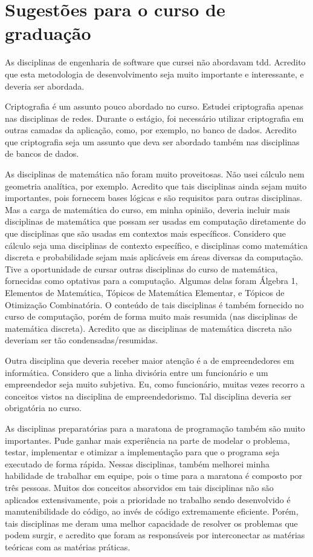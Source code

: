 \section{Sugestões para o curso de graduação}

As disciplinas de engenharia de software que cursei não abordavam \gls{tdd}. Acredito que esta metodologia de desenvolvimento seja
muito importante e interessante, e deveria ser abordada.

Criptografia é um assunto pouco abordado no curso. Estudei criptografia apenas nas disciplinas de redes. Durante o estágio, foi necessário
utilizar criptografia em outras camadas da aplicação, como, por exemplo, no banco de dados. Acredito que criptografia seja um assunto
que deva ser abordado também nas disciplinas de bancos de dados.

As disciplinas de matemática não foram muito proveitosas. Não usei cálculo nem geometria analítica, por exemplo. 
Acredito que tais disciplinas ainda sejam muito importantes, pois fornecem bases lógicas e são requisitos para outras disciplinas. 
Mas a carga de matemática do curso, em minha opinião, deveria incluir mais disciplinas de matemática que possam ser usadas em computação 
diretamente do que disciplinas que são usadas em contextos mais específicos. Considero que cálculo seja uma disciplinas de contexto 
específico, e disciplinas como matemática discreta e probabilidade sejam mais aplicáveis em áreas diversas da computação. Tive a 
oportunidade de cursar outras disciplinas do curso de matemática, fornecidas como optativas para a computação. Algumas delas 
foram Álgebra 1, Elementos de Matemática, Tópicos de Matemática Elementar, e Tópicos de Otimização Combinatória. O conteúdo de 
tais disciplinas é também fornecido no curso de computação, porém de forma muito mais resumida (nas disciplinas de matemática discreta). 
Acredito que as disciplinas de matemática discreta não deveriam ser tão condensadas/resumidas.

Outra disciplina que deveria receber maior atenção é a de empreendedores em informática. Considero que a linha divisória entre um 
funcionário e um empreendedor seja muito subjetiva. Eu, como funcionário, muitas vezes recorro a conceitos vistos na disciplina de 
empreendedorismo. Tal disciplina deveria ser obrigatória no curso.

As disciplinas preparatórias para a maratona de programação também são muito importantes. Pude ganhar mais experiência 
na parte de modelar o problema, testar, implementar e otimizar a implementação para que o programa seja executado de forma rápida. 
Nessas disciplinas, também melhorei minha habilidade de trabalhar em equipe, pois o time para a maratona é composto por três pessoas. 
Muitos dos conceitos absorvidos em tais disciplinas não são aplicados extensivamente, pois a prioridade no trabalho sendo desenvolvido é 
manutenibilidade do código, ao invés de código extremamente eficiente. Porém, tais disciplinas me deram uma melhor capacidade de 
resolver os problemas que podem surgir, e acredito que foram as responsáveis por interconectar as matérias teóricas com as matérias práticas.

